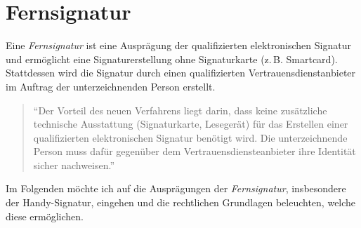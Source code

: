 \documentclass[11pt,a4paper,ngerman]{scrreprt}
\begin{document}
\chapter{Fernsignatur}
Eine \textit{Fernsignatur} ist eine Ausprägung der qualifizierten elektronischen Signatur und ermöglicht eine Signaturerstellung ohne Signaturkarte (z.\,B. Smartcard). Stattdessen wird die Signatur durch einen qualifizierten Vertrauensdienstanbieter im Auftrag der unterzeichnenden Person erstellt.
\begin{quote}
    ``Der Vorteil des neuen Verfahrens liegt darin, dass keine zusätzliche technische Ausstattung (Signaturkarte, Lesegerät) für das Erstellen einer qualifizierten elektronischen Signatur benötigt wird. Die unterzeichnende Person muss dafür gegenüber dem Vertrauensdiensteanbieter ihre Identität sicher nachweisen.''\cite{fernsig}
\end{quote}
Im Folgenden möchte ich auf die Ausprägungen der \textit{Fernsignatur}, insbesondere der Handy-Signatur, eingehen und die rechtlichen Grundlagen beleuchten, welche diese ermöglichen.
\end{document}

